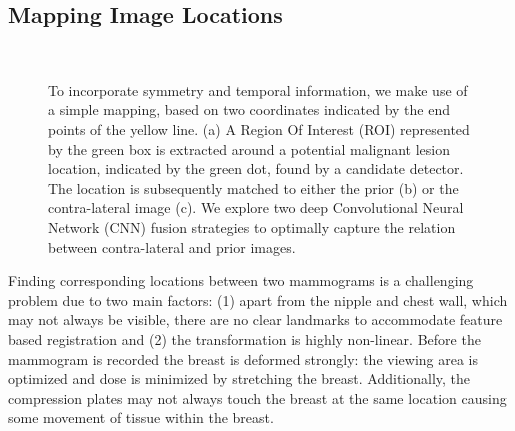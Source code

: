 \documentclass[12pt]{spieman}  %
\begin{document}
\subsection{Mapping Image Locations}
\label{sec::mapping_locations}
\begin{figure}
 \centering
  \\
 \hspace{0.5cm}
 
 \caption{To incorporate symmetry and temporal information, we make use of a simple mapping, based on two coordinates indicated by the end points of the yellow line. (a) A Region Of Interest (ROI) represented by the green box is extracted around a potential malignant lesion location, indicated by the green dot, found by a candidate detector. The location is subsequently matched to either the prior (b) or the contra-lateral image (c). We explore two deep Convolutional Neural Network (CNN) fusion strategies to optimally capture the relation between contra-lateral and prior images.}
 \label{fig::symmetry_mapping_example}
\end{figure}
Finding corresponding locations between two mammograms is a challenging problem due to two main factors: (1) apart from the nipple and chest wall, which may not always be visible, there are no clear landmarks to accommodate feature based registration and (2) the transformation is highly non-linear. Before the mammogram is recorded the breast is deformed strongly: the viewing area is optimized and dose is minimized by stretching the breast. Additionally, the compression plates may not always touch the breast at the same location causing some movement of tissue within the breast. \\
\end{document}
